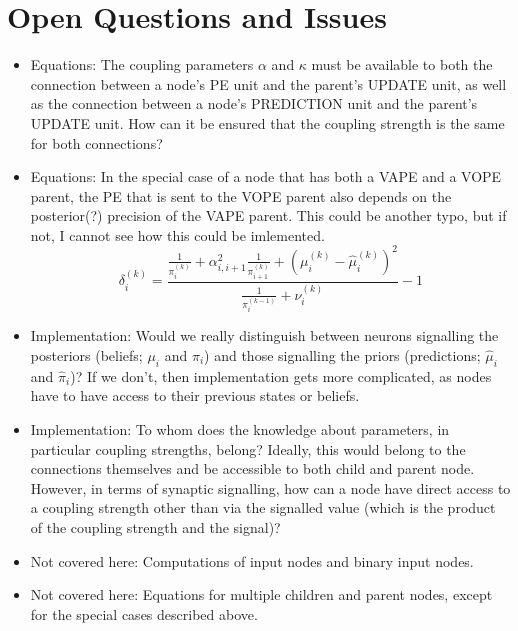 \section{Open Questions and Issues}

\begin{itemize}
\item Equations: The coupling parameters $\alpha$ and $\kappa$ must be available to both the connection between a node's \textsf{PE unit} and the parent's \textsf{UPDATE unit}, as well as the connection between a node's \textsf{PREDICTION unit} and the parent's \textsf{UPDATE unit}. How can it be ensured that the coupling strength is the same for both connections?

\item Equations: In the special case of a node that has both a \textsf{VAPE} and a \textsf{VOPE} parent, the PE that is sent to the \textsf{VOPE} parent also depends on the posterior(?) precision of the \textsf{VAPE} parent. This could be another typo, but if not, I cannot see how this could be imlemented.
\begin{equation}
\delta_i^{(k)} 	= \frac{\frac{1}{\pi_i^{(k)}}
				+ \alpha_{i,i+1}^2 \frac{1}{\pi_{i+1}^{(k)}}
				+ (\mu_i^{(k)} - \hat{\mu}_i^{(k)})^2}
				{\frac{1}{\pi_i^{(k-1)}} + \nu_i^{(k)}} - 1
\end{equation}

\item Implementation: Would we really distinguish between neurons signalling the posteriors (beliefs; $\mu_i$ and $\pi_i$) and those signalling the priors (predictions; $\hat{\mu}_i$ and $\hat{\pi}_i$)? If we don't, then implementation gets more complicated, as nodes have to have access to their previous states or beliefs.

\item Implementation: To whom does the knowledge about parameters, in particular coupling strengths, belong? Ideally, this would belong to the connections themselves and be accessible to both child and parent node. However, in terms of synaptic signalling, how can a node have direct access to a coupling strength other than via the signalled value (which is the product of the coupling strength and the signal)?

\item Not covered here: Computations of input nodes and binary input nodes.
\item Not covered here: Equations for multiple children and parent nodes, except for the special cases described above.
\end{itemize}